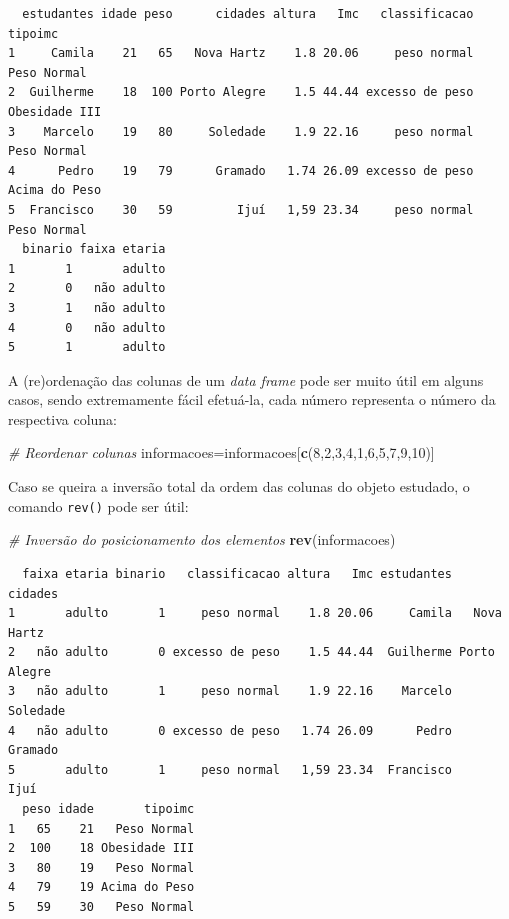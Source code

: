 \documentclass[12pt,brazil,oneside]{book}
\newenvironment{Shaded}{\begin{snugshade}}{\end{snugshade}}
\newcommand{\CommentTok}[1]{\textcolor[rgb]{0.56,0.35,0.01}{\textit{#1}}}
\newcommand{\DecValTok}[1]{\textcolor[rgb]{0.00,0.00,0.81}{#1}}
\newcommand{\KeywordTok}[1]{\textcolor[rgb]{0.13,0.29,0.53}{\textbf{#1}}}
\newcommand{\NormalTok}[1]{#1}
\begin{document}
\begin{verbatim}
  estudantes idade peso      cidades altura   Imc   classificacao       tipoimc
1     Camila    21   65   Nova Hartz    1.8 20.06     peso normal   Peso Normal
2  Guilherme    18  100 Porto Alegre    1.5 44.44 excesso de peso Obesidade III
3    Marcelo    19   80     Soledade    1.9 22.16     peso normal   Peso Normal
4      Pedro    19   79      Gramado   1.74 26.09 excesso de peso Acima do Peso
5  Francisco    30   59         Ijuí   1,59 23.34     peso normal   Peso Normal
  binario faixa etaria
1       1       adulto
2       0   não adulto
3       1   não adulto
4       0   não adulto
5       1       adulto
\end{verbatim}

A (re)ordenação das colunas de um \emph{data frame} pode ser muito útil em alguns casos, sendo extremamente fácil efetuá-la, cada número representa o número da respectiva coluna:

\begin{Shaded}
\begin{Highlighting}[]
\CommentTok{# Reordenar colunas}
\NormalTok{informacoes=informacoes[}\KeywordTok{c}\NormalTok{(}\DecValTok{8}\NormalTok{,}\DecValTok{2}\NormalTok{,}\DecValTok{3}\NormalTok{,}\DecValTok{4}\NormalTok{,}\DecValTok{1}\NormalTok{,}\DecValTok{6}\NormalTok{,}\DecValTok{5}\NormalTok{,}\DecValTok{7}\NormalTok{,}\DecValTok{9}\NormalTok{,}\DecValTok{10}\NormalTok{)]}
\end{Highlighting}
\end{Shaded}

Caso se queira a inversão total da ordem das colunas do objeto estudado, o comando \texttt{rev()} pode ser útil:

\begin{Shaded}
\begin{Highlighting}[]
\CommentTok{# Inversão do posicionamento dos elementos}
\KeywordTok{rev}\NormalTok{(informacoes)}
\end{Highlighting}
\end{Shaded}

\begin{verbatim}
  faixa etaria binario   classificacao altura   Imc estudantes      cidades
1       adulto       1     peso normal    1.8 20.06     Camila   Nova Hartz
2   não adulto       0 excesso de peso    1.5 44.44  Guilherme Porto Alegre
3   não adulto       1     peso normal    1.9 22.16    Marcelo     Soledade
4   não adulto       0 excesso de peso   1.74 26.09      Pedro      Gramado
5       adulto       1     peso normal   1,59 23.34  Francisco         Ijuí
  peso idade       tipoimc
1   65    21   Peso Normal
2  100    18 Obesidade III
3   80    19   Peso Normal
4   79    19 Acima do Peso
5   59    30   Peso Normal
\end{verbatim}
\end{document}

